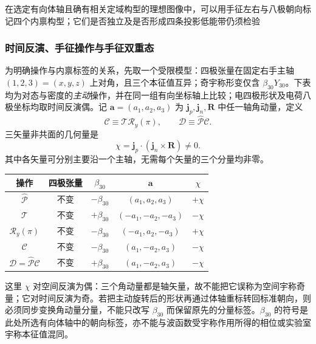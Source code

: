 在选定有向体轴且确有相关定域构型的理想图像中，可以用手征左右与八极朝向标记四个内禀构型；它们是否独立及是否形成四条投影低能带仍须检验

\subsubsection{时间反演、手征操作与手征双重态}

为明确操作与内禀标签的关系，先取一个受限模型：四极张量在固定右手主轴 $(1,2,3)=(x,y,z)$ 上对角，且三个本征值互异；奇宇称形变仅含 $\beta_{30}Y_{30}$。下表均为对态与密度的\emph{主动}操作，并在同一组有向坐标轴上比较；电四极形状及电荷八极坐标均取时间反演偶。记 $\mathbf{a}=(a_1,a_2,a_3)$ 为 $\mathbf j_p,\mathbf j_n,\mathbf R$ 中任一轴角动量，定义
\begin{equation}\label{eq:4-5-chiral-op}
\mathcal C\equiv\mathcal T\mathcal R_y(\pi),\qquad
\mathcal D\equiv\hat{\mathcal P}\mathcal C.
\end{equation}
三矢量非共面的几何量是
\begin{equation}\label{eq:4-5-chiral-triple-product}
\chi=\mathbf j_p\cdot(\mathbf j_n\times\mathbf R)\ne0.
\end{equation}
其中各矢量可分别主要沿一个主轴，无需每个矢量的三个分量均非零。
\begin{center}
\begin{tabular}{c|c|c|c|c}
操作 & 四极张量 & $\beta_{30}$ & $\mathbf a$ & $\chi$ \\
\hline
$\hat{\mathcal P}$ & 不变 & $-\beta_{30}$ & $(a_1,a_2,a_3)$ & $+\chi$ \\
$\mathcal T$ & 不变 & $+\beta_{30}$ & $(-a_1,-a_2,-a_3)$ & $-\chi$ \\
$\mathcal R_y(\pi)$ & 不变 & $-\beta_{30}$ & $(-a_1,a_2,-a_3)$ & $+\chi$ \\
$\mathcal C$ & 不变 & $-\beta_{30}$ & $(a_1,-a_2,a_3)$ & $-\chi$ \\
$\mathcal D=\hat{\mathcal P}\mathcal C$ & 不变 & $+\beta_{30}$ & $(a_1,-a_2,a_3)$ & $-\chi$
\end{tabular}
\end{center}
这里 $\chi$ 对空间反演为偶：三个角动量都是轴矢量，故不能把它误称为空间宇称奇量；它对时间反演为奇。若把主动旋转后的形状再通过体轴重标转回标准朝向，则必须同步变换角动量分量，不能只改写 $\beta_{30}$ 而保留原先的分量标签。$\beta_{30}$ 的符号是此处所选有向体轴中的朝向标签，亦不能与波函数受宇称作用所得的相位或实验室宇称本征值混同。


